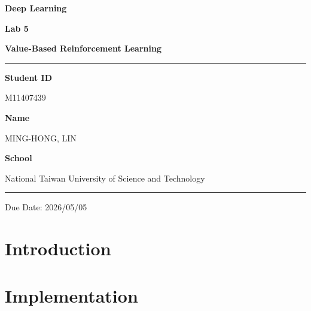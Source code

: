 \documentclass[12pt,a4paper]{report}
\begin{document}
\pagestyle{plain}

\begin{titlepage}
\centering
\vspace*{3cm}

{\fontsize{28}{34}\selectfont\bfseries Deep Learning\par}
\vspace{0.6em}
{\fontsize{20}{26}\selectfont\bfseries Lab 5 \par}
\vspace{0.4em}
{\fontsize{16}{22}\selectfont\bfseries Value-Based Reinforcement Learning \par}

\vspace{1.5cm}
\textcolor{crimson}{\rule{0.6\linewidth}{1.2pt}}
\vspace{1.5cm}

{\large\bfseries Student ID}\par
\vspace{0.4em}
{\large M11407439}\par

\vspace{0.8em}

{\large\bfseries Name}\par
\vspace{0.4em}
{\large MING-HONG, LIN}\par

\vspace{0.8cm}

{\large\bfseries School}\par
\vspace{0.4em}
{\large National Taiwan University of Science and Technology }\par

\vfill

\textcolor{crimson}{\rule{0.6\linewidth}{0.6pt}}\par
\vspace{0.5em}
{\small Due Date: 2026/05/05}

\end{titlepage}

\tableofcontents
\newpage

\chapter{Introduction}

\chapter{Implementation}
\end{document}
